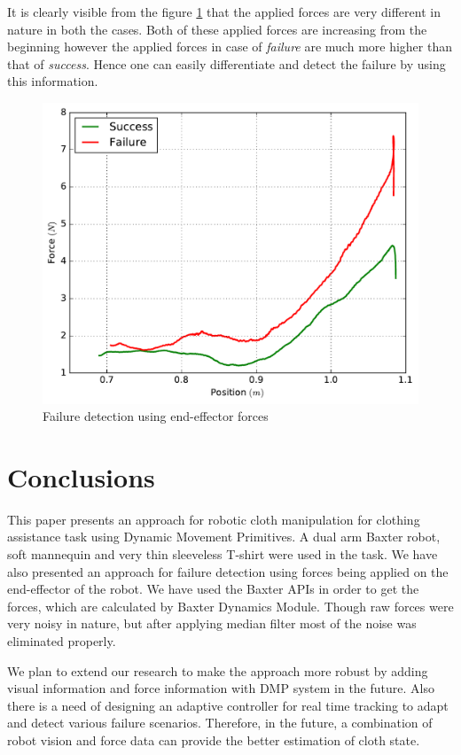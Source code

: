 \documentclass[sigconf]{acmart}
\begin{document}
It is clearly visible from the figure \ref{fig:position_force} that the applied forces are very different in nature in both the cases. Both of these applied forces are increasing from the beginning however the applied forces in case of \textit{failure} are much more higher than that of \textit{success}. Hence one can easily differentiate and detect the failure by using this information.

\begin{figure}
	\includegraphics[width=\linewidth]{position_force}
	\caption{Failure detection using end-effector forces}
	\label{fig:position_force}
\end{figure}

\section{Conclusions}
\label{sec:conclusions}
This paper presents an approach for robotic cloth manipulation for clothing assistance task using Dynamic Movement Primitives. A dual arm Baxter robot, soft mannequin and very thin sleeveless T-shirt were used in the task. We have also presented an approach for failure detection using forces being applied on the end-effector of the robot. We have used the Baxter APIs in order to get the forces, which are calculated by Baxter Dynamics Module. Though raw forces were very noisy in nature, but after applying median filter most of the noise was eliminated properly.

We plan to extend our research to make the approach more robust by adding visual information and force information with DMP system in the future. Also there is a need of designing an adaptive controller for real time tracking to adapt and detect various failure scenarios. Therefore, in the future, a combination of robot vision and force data can provide the better estimation of cloth state.
\end{document}
